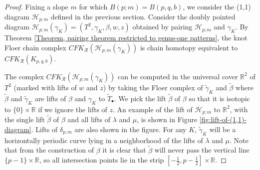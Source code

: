 \documentclass{amsart}
\newcommand{\R}{\mathbb{R}}
\theoremstyle{definition}
\theoremstyle{remark}
\numberwithin{equation}{section}
\numberwithin{equation}{section} \makeatletter
\begin{document}
\begin{proof}%
Fixing a slope $m$ for which $B(p;m) = B(p,q,b)$, we consider the (1,1) diagram $\mathcal{H}_{p;m}$ defined in the previous section. Consider the doubly pointed diagram $\mathcal{H}_{p;m}(\gamma_K)=(T^2,\gamma_K,\beta,w,z)$ obtained by pairing $\mathcal{H}_{p;m}$ and $\gamma_K$. By Theorem \ref{Theorem, pairing theorem restricted to genus-one patterns}, the knot Floer chain complex $CFK_\mathcal{R}(\mathcal{H}_{p;m}(\gamma_K))$ is chain homotopy equivalent to $CFK_{\mathcal{R}}(K_{p,q,b})$. 
	
	The complex $CFK_\mathcal{R}(\mathcal{H}_{p;m}(\gamma_K))$ can be computed in the universal cover $\mathbb{R}^2$ of $T^2$ (marked with lifts of $w$ and $z$) by taking the Floer complex of $\tilde{\gamma}_K$ and $\tilde{\beta}$ where $\tilde{\beta}$ and $\tilde\gamma_K$ are lifts of $\beta$ and $\gamma_K$ to $\widetilde T_\bullet$. We pick the lift $\tilde\beta$ of $\beta$ so that it is isotopic to $\{0\}\times \R$ if we ignore the lifts of $z$. An example of the lift of $\mathcal{H}_{p;m}$ to $\mathbb{R}^2$, with the single lift $\tilde{\beta}$ of $\beta$ and all lifts of $\lambda$ and $\mu$, is shown in Figure \ref{fig:lift-of-(1,1)-diagram}.  Lifts of $\delta_{p;m}$ are also shown in the figure. For any $K$, $\tilde{\gamma}_K$ will be a horizontally periodic curve lying in a neighborhood of the lifts of $\lambda$ and $\mu$. Note that from the construction of $\beta$ it is clear that $\tilde\beta$ will never pass the vertical line $\{p-1\}\times \R$, so all intersection points lie in the strip $\left[ -\frac 1 2, p - \frac 1 2\right] \times \R$.
	

\end{proof}
\end{document}
